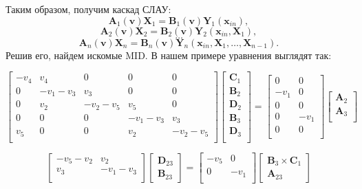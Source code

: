 \documentclass[14pt, a4paper]{extreport}
\begin{document}
Таким образом, получим каскад СЛАУ:
$$\mathbf{A}_1(\mathbf{v})\mathbf{X}_1 = \mathbf{B}_1(\mathbf{v})\mathbf{Y}_1(\mathbf{x}_{in}),$$
$$\mathbf{A}_2(\mathbf{v})\mathbf{X}_2 = \mathbf{B}_2(\mathbf{v})\mathbf{Y}_2(\mathbf{x}_{in}, \mathbf{X}_1),$$
$$\dots$$
$$\mathbf{A}_n(\mathbf{v})\mathbf{X}_n = \mathbf{B}_n(\mathbf{v})\mathbf{Y}_n(\mathbf{x}_{in}, \mathbf{X}_1, \ldots, \mathbf{X}_{n - 1}).$$
Решив его, найдем искомые MID. В нашем примере уравнения выглядят так:

$$\begin{bmatrix}
-v_4 & v_4 & 0 & 0 & 0\\
0 & -v_1-v_3 & v_3 & 0 & 0\\
0 & v_2 & -v_2-v_5 & v_5 & 0\\
0 & 0 & 0 & -v_1-v_3 & v_3 \\
v_5 & 0 & 0 & v_2 & -v_2-v_5\\
\end{bmatrix}
\begin{bmatrix}
	\mathbf{C}_1\\
	\mathbf{B}_2\\
	\mathbf{D}_2\\
	\mathbf{B}_3\\
	\mathbf{D}_3\\
\end{bmatrix}
=
\begin{bmatrix}
	0 & 0\\
	-v_1 & 0\\
	0 & 0\\
	0 & -v_1\\
	0 & 0\\
\end{bmatrix}
\begin{bmatrix}
	\mathbf{A}_2\\
	\mathbf{A}_3\\
\end{bmatrix}$$

$$\begin{bmatrix}
-v_5-v_2 & v_2\\
v_3 & -v_1-v_3\\
\end{bmatrix}
\begin{bmatrix}
\mathbf{D}_{23}\\
\mathbf{B}_{23}
\end{bmatrix}
=
\begin{bmatrix}
-v_5 & 0\\
0 & -v_1\\
\end{bmatrix}
\begin{bmatrix}
\mathbf{B}_3 \times \mathbf{C}_1\\
\mathbf{A}_{23}
\end{bmatrix}$$
\end{document}
